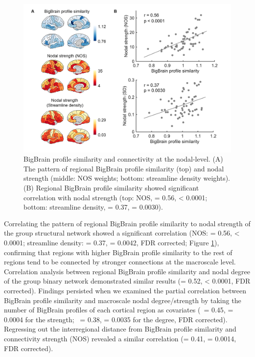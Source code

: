 \begin{refsection}
\begin{figure}[h]
    \centering
    \includegraphics[width=\linewidth]{images/thesis_bb_fig5.jpg}
    \caption{BigBrain profile similarity and connectivity at the nodal-level. (A) The pattern of regional BigBrain profile similarity (top) and nodal strength (middle: NOS weights; bottom: streamline density weights). (B) Regional BigBrain profile similarity showed significant correlation with nodal strength (top: NOS, \rval = 0.56, \pval < 0.0001; bottom: streamline density, \rval = 0.37, \pval = 0.0030).}
    \label{bigbrainFig5}
\end{figure}

Correlating the pattern of regional BigBrain profile similarity to nodal strength of the group structural network showed a significant correlation (NOS: \rval = 0.56, \pval < 0.0001; streamline density: \rval = 0.37, \pval = 0.0042, FDR corrected; Figure \ref{bigbrainFig5}), confirming that regions with higher BigBrain profile similarity to the rest of regions tend to be connected by stronger connections at the macroscale level. Correlation analysis between regional BigBrain profile similarity and nodal degree of the group binary network demonstrated similar results (\rval = 0.52, \pval < 0.0001, FDR corrected). Findings persisted when we examined the partial correlation between BigBrain profile similarity and macroscale nodal degree/strength by taking the number of BigBrain profiles of each cortical region as covariates (\textrho \ = 0.45, \pval = 0.0004 for the strength; \textrho \ = 0.38, \pval = 0.0035 for the degree, FDR corrected). Regressing out the interregional distance from BigBrain profile similarity and connectivity strength (NOS) revealed a similar correlation (\rval = 0.41, \pval = 0.0014, FDR corrected).



\end{refsection}
